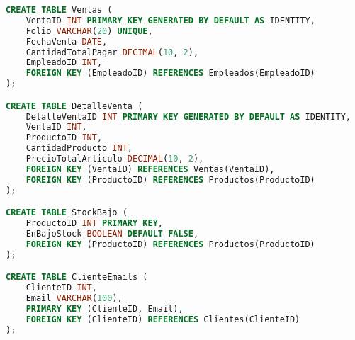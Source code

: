 \documentclass[10pt,openany]{book}
\begin{document}
\begin{lstlisting}[language=SQL]
CREATE TABLE Ventas (
    VentaID INT PRIMARY KEY GENERATED BY DEFAULT AS IDENTITY,
    Folio VARCHAR(20) UNIQUE,
    FechaVenta DATE,
    CantidadTotalPagar DECIMAL(10, 2),
    EmpleadoID INT,
    FOREIGN KEY (EmpleadoID) REFERENCES Empleados(EmpleadoID)
);

CREATE TABLE DetalleVenta (
    DetalleVentaID INT PRIMARY KEY GENERATED BY DEFAULT AS IDENTITY,
    VentaID INT,
    ProductoID INT,
    CantidadProducto INT,
    PrecioTotalArticulo DECIMAL(10, 2),
    FOREIGN KEY (VentaID) REFERENCES Ventas(VentaID),
    FOREIGN KEY (ProductoID) REFERENCES Productos(ProductoID)
);

CREATE TABLE StockBajo (
    ProductoID INT PRIMARY KEY,
    EnBajoStock BOOLEAN DEFAULT FALSE,
    FOREIGN KEY (ProductoID) REFERENCES Productos(ProductoID)
);

CREATE TABLE ClienteEmails (
    ClienteID INT,
    Email VARCHAR(100),
    PRIMARY KEY (ClienteID, Email),
    FOREIGN KEY (ClienteID) REFERENCES Clientes(ClienteID)
);
\end{lstlisting}




\end{document}
